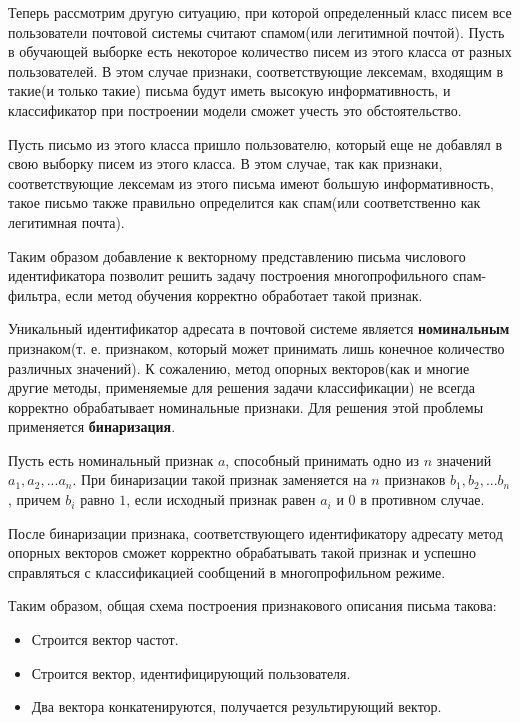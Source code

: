 Теперь рассмотрим другую ситуацию, при которой определенный класс писем все пользователи почтовой системы считают спамом(или легитимной почтой). Пусть в обучающей выборке есть некоторое количество писем из этого класса от разных пользователей. В этом случае признаки, соответствующие лексемам, входящим в такие(и только такие) письма будут иметь высокую информативность, и классификатор при построении модели сможет учесть это обстоятельство.

Пусть письмо из этого класса пришло пользователю, который еще не добавлял в свою выборку писем из этого класса. В этом случае, так как признаки, соответствующие лексемам из этого письма имеют большую информативность, такое письмо также правильно определится как спам(или соответственно как легитимная почта).

Таким образом добавление к векторному представлению письма числового идентификатора позволит решить задачу построения многопрофильного спам-фильтра, если метод обучения корректно обработает такой признак. 

Уникальный идентификатор адресата в почтовой системе является \textbf{номинальным} признаком(т. е. признаком, который может принимать лишь конечное количество различных значений). К сожалению, метод опорных векторов(как и многие другие методы, применяемые для решения задачи классификации) не всегда корректно обрабатывает номинальные признаки.\cite{YURYSVM} Для решения этой проблемы применяется \textbf{бинаризация}.

Пусть есть номинальный признак $a$, способный принимать одно из $n$ значений $a_1, a_2, ... a_n$. При бинаризации такой признак заменяется на $n$ признаков $b_1, b_2, ... b_n$, причем $b_i$ равно $1$, если исходный признак равен $a_i$ и $0$ в противном случае.

После бинаризации признака, соответствующего идентификатору адресату метод опорных векторов сможет корректно обрабатывать такой признак и успешно справляться с классификацией сообщений в многопрофильном режиме.

Таким образом, общая схема построения признакового описания письма такова:

\begin{itemize}
	\item Строится вектор частот.
	\item Строится вектор, идентифицирующий пользователя.
	\item Два вектора конкатенируются, получается результирующий вектор.
\end{itemize}

